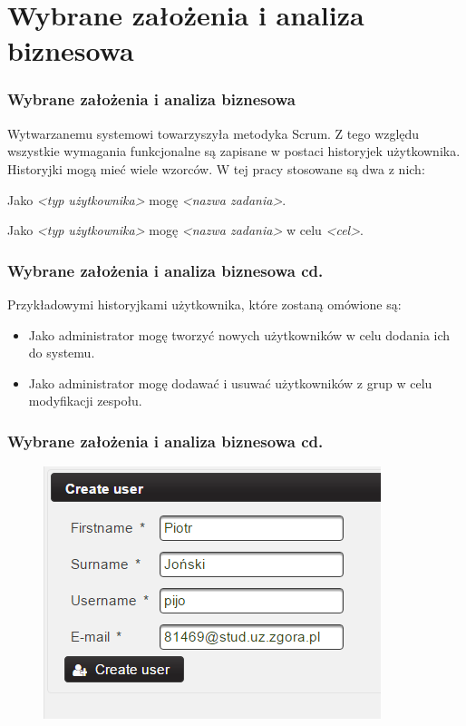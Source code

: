 \documentclass[hyperref={pdfpagelabels=false}]{beamer}
\begin{document}
\section{Wybrane założenia i analiza biznesowa}
\begin{frame}
	\frametitle{Wybrane założenia i analiza biznesowa}
	Wytwarzanemu systemowi towarzyszyła metodyka Scrum. Z tego względu wszystkie wymagania funkcjonalne są zapisane w postaci historyjek użytkownika. Historyjki mogą mieć wiele wzorców. \pause W tej pracy stosowane są dwa z nich:
	\pause
	\item Jako \pause \textit{\textless typ użytkownika\textgreater} \pause mogę \pause \textit{\textless nazwa zadania\textgreater}.
	\pause
	\item Jako \textit{\textless typ użytkownika\textgreater} mogę \textit{\textless nazwa zadania\textgreater} \pause w celu \pause \textit{\textless cel\textgreater}.	
\end{frame}
\begin{frame}
	\frametitle{Wybrane założenia i analiza biznesowa cd.}
	Przykładowymi historyjkami użytkownika, które zostaną omówione są:
	\pause
	\begin{itemize}
		\item Jako administrator mogę tworzyć nowych użytkowników w celu dodania ich do systemu.
		\pause
		\item Jako administrator mogę dodawać i usuwać użytkowników z grup w celu modyfikacji zespołu.
	\end{itemize}
\end{frame}
\begin{frame}
	\frametitle{Wybrane założenia i analiza biznesowa cd.}
	\begin{figure}
		\centering
		\includegraphics[width=0.7\linewidth]{user-stworz}
	\end{figure}
\end{frame}
\end{document}
